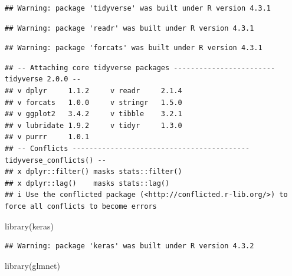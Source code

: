\documentclass[
]{book}
\newenvironment{Shaded}{\begin{snugshade}}{\end{snugshade}}
\newcommand{\AttributeTok}[1]{\textcolor[rgb]{0.77,0.63,0.00}{#1}}
\newcommand{\ConstantTok}[1]{\textcolor[rgb]{0.00,0.00,0.00}{#1}}
\newcommand{\DecValTok}[1]{\textcolor[rgb]{0.00,0.00,0.81}{#1}}
\newcommand{\FunctionTok}[1]{\textcolor[rgb]{0.00,0.00,0.00}{#1}}
\newcommand{\NormalTok}[1]{#1}
\newcommand{\SpecialCharTok}[1]{\textcolor[rgb]{0.00,0.00,0.00}{#1}}
\begin{document}
\begin{Shaded}
\end{Shaded}

\begin{verbatim}
## Warning: package 'tidyverse' was built under R version 4.3.1
\end{verbatim}

\begin{verbatim}
## Warning: package 'readr' was built under R version 4.3.1
\end{verbatim}

\begin{verbatim}
## Warning: package 'forcats' was built under R version 4.3.1
\end{verbatim}

\begin{verbatim}
## -- Attaching core tidyverse packages ------------------------ tidyverse 2.0.0 --
## v dplyr     1.1.2     v readr     2.1.4
## v forcats   1.0.0     v stringr   1.5.0
## v ggplot2   3.4.2     v tibble    3.2.1
## v lubridate 1.9.2     v tidyr     1.3.0
## v purrr     1.0.1     
## -- Conflicts ------------------------------------------ tidyverse_conflicts() --
## x dplyr::filter() masks stats::filter()
## x dplyr::lag()    masks stats::lag()
## i Use the conflicted package (<http://conflicted.r-lib.org/>) to force all conflicts to become errors
\end{verbatim}

\begin{Shaded}
\begin{Highlighting}[]
\FunctionTok{library}\NormalTok{(keras)}
\end{Highlighting}
\end{Shaded}

\begin{verbatim}
## Warning: package 'keras' was built under R version 4.3.2
\end{verbatim}

\begin{Shaded}
\begin{Highlighting}[]
\FunctionTok{library}\NormalTok{(glmnet)}
\end{Highlighting}
\end{Shaded}
\end{document}
